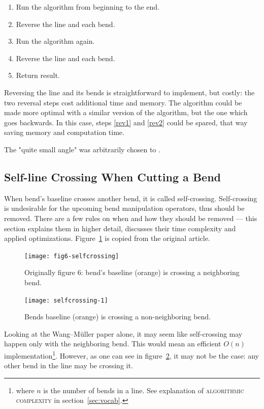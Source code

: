 \documentclass[a4paper]{article}
\newcommand{\WM}{Wang--M{\"u}ller}
\begin{document}
\begin{enumerate}
    \item Run the algorithm from beginning to the end.
    \item \label{rev1} Reverse the line and each bend.
    \item Run the algorithm again.
    \item \label{rev2} Reverse the line and each bend.
    \item Return result.
\end{enumerate}

Reversing the line and its bends is straightforward to implement, but costly:
the two reversal steps cost additional time and memory. The algorithm could be
made more optimal with a similar version of the algorithm, but the one which
goes backwards. In this case, steps \ref{rev1} and \ref{rev2} could be spared,
that way saving memory and computation time.

The "quite small angle" was arbitrarily chosen to \smallAngle.

\subsection{Self-line Crossing When Cutting a Bend}

When bend's baseline crosses another bend, it is called self-crossing.
Self-crossing is undesirable for the upcoming bend manipulation operators, thus
should be removed. There are a few rules on when and how they should be removed
--- this section explains them in higher detail, discusses their time
complexity and applied optimizations. Figure~\ref{fig:fig6-selfcrossing} is
copied from the original article.

\begin{figure}[ht]
    \centering
    \texttt{[image: fig6-selfcrossing]}
    \caption{Originally figure 6: bend's baseline (orange) is crossing a neighboring bend.}
    \label{fig:fig6-selfcrossing}
\end{figure}

\begin{figure}[ht]
    \centering
    \texttt{[image: selfcrossing-1]}
    \caption{Bends baseline (orange) is crossing a non-neighboring bend.}
    \label{fig:selfcrossing-1-non-neighbor}
\end{figure}

Looking at the {\WM} paper alone, it may seem like self-crossing may happen
only with the neighboring bend. This would mean an efficient $O(n)$
implementation\footnote{where $n$ is the number of bends in a line. See
explanation of \textsc{algorithmic complexity} in section~\ref{sec:vocab}.}.
However, as one can see in figure~\ref{fig:selfcrossing-1-non-neighbor}, it may
not be the case: any other bend in the line may be crossing it.
\end{document}
